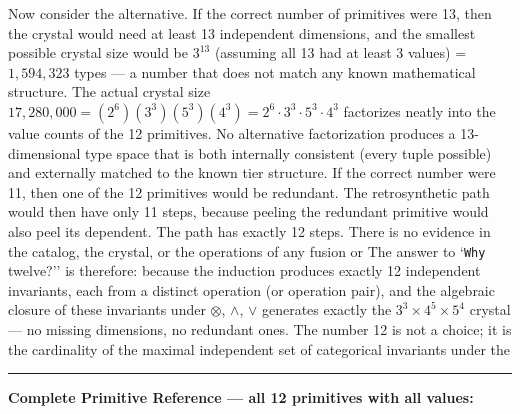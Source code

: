 \documentclass[12pt,a4paper]{article}
\makeatletter
\renewcommand{\_}{\ig@origunderscore\discretionary{}{}{}}
\makeatother
\begin{document}
Now consider the alternative. If the correct number of primitives were 13, then the crystal would need at least 13
independent dimensions, and the smallest possible crystal size would be $3^{13}$ (assuming all 13 had at least 3
values) = $1{,}594{,}323$ types --- a number that does not match any known mathematical structure. The actual crystal
size $17{,}280{,}000 = (2^6)(3^3)(5^3)(4^3) = 2^6 \cdot 3^3 \cdot 5^3 \cdot 4^3$ factorizes neatly into the value
counts of the 12 primitives. No alternative factorization produces a 13-dimensional type space that is both internally
consistent (every tuple possible) and externally matched to the known tier structure.
If the correct number were 11, then one of the 12 primitives would be redundant. The retrosynthetic path would then
have only 11 steps, because peeling the redundant primitive would also peel its dependent. The path has exactly 12
steps. There is no evidence in the catalog, the crystal, or the operations of any fusion or
The answer to `\texttt{Why} twelve?'' is therefore: because the induction produces exactly 12 independent invariants, each from
a distinct operation (or operation pair), and the algebraic closure of these invariants under
$\otimes$, $\wedge$,
$\vee$ generates exactly the $3^3 \times 4^5 \times 5^4$ crystal --- no missing dimensions, no redundant ones. The
number 12 is not a choice; it is the cardinality of the maximal independent set of categorical invariants under the

\begin{center}
\rule{0.5\textwidth}{0.4pt}
\end{center}

\textbf{Complete Primitive Reference --- all 12 primitives with all values:}
\end{document}

